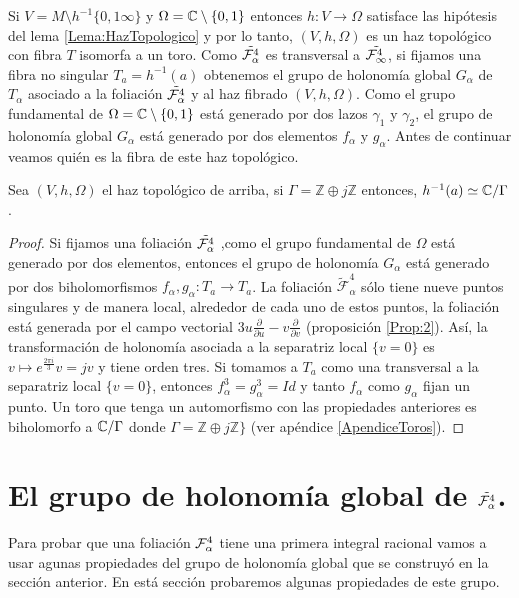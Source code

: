  Si $V=M\setminus h^{-1}\{0,1\infty\}$ y $\Omega=\mathbb{C}\setminus\{0,1\}$ entonces $h\colon V\rightarrow\Omega$ satisface las hipótesis del lema \ref{Lema:HazTopologico} y por lo tanto, $(V,h,\Omega)$ es un haz topológico con fibra $T$ isomorfa a un toro. Como $\tilde{\mathcal{F}_{\alpha}^{4}}$ es transversal a $\tilde{\mathcal{F}_{\infty}^{4}}$, si fijamos una fibra no singular $T_{a}=h^{-1}(a)$ obtenemos el grupo de holonomía global $G_{\alpha}$ de $T_{\alpha}$ asociado a la foliación $\tilde{\mathcal{F}_{\alpha}^{4}}$ y al haz fibrado $(V,h,\Omega)$. Como el grupo fundamental de $\Omega=\mathbb{C}\setminus\{0,1\}$ está generado por dos lazos $\gamma_{1}$ y $\gamma_{2}$, el grupo de holonomía global $G_{\alpha}$ está generado por dos elementos $f_{\alpha}$ y $g_{\alpha}$. Antes de continuar veamos quién es la fibra de este haz topológico.
\begin{Proposicion}
\label{Prop:FibraDelHaz}
Sea $(V,h,\Omega)$ el haz topológico de arriba, si $\Gamma=\mathbb{Z}\oplus j\mathbb{Z}$ entonces, $h^{-1}(a)\simeq\mathbb{C}/\Gamma$.
\end{Proposicion}
\begin{proof}
Si fijamos una foliación $\tilde{\mathcal{F}_{\alpha}^{4}}$ ,como el grupo fundamental de $\Omega$ está generado por dos elementos, entonces  el grupo de holonomía $G_{\alpha}$ está generado por dos biholomorfismos $f_{\alpha},g_{\alpha}\colon T_{a}\rightarrow T_{a}$. La foliación $\tilde{\mathcal{F}}_{\alpha}^{4}$ sólo tiene nueve puntos singulares y de manera local, alrededor de cada uno de estos puntos, la foliación está generada por el campo vectorial $3u\tfrac{\partial}{\partial u}-v\tfrac{\partial}{\partial v}$ (proposición \ref{Prop:2}). Así, la transformación de holonomía asociada a la separatriz local $\{v=0\}$ es $v\mapsto e^{\tfrac{2\pi i}{3}}v=jv$ y tiene orden tres. Si tomamos a $T_{a}$ como una transversal a la separatriz local $\{v=0\}$, entonces $f_{\alpha}^{3}=g_{\alpha}^{3}=Id$ y tanto $f_{\alpha}$ como $g_{\alpha}$ fijan un punto. Un toro que tenga un automorfismo con las propiedades anteriores es biholomorfo a $\mathbb{C}/\Gamma$ donde $\Gamma=\mathbb{Z}\oplus j\mathbb{Z} \}$ (ver apéndice \ref{ApendiceToros}).
\end{proof}

\section{El grupo de holonomía global de $\tilde{\mathcal{F}_{\alpha}^{4}}$.}

Para probar que una foliación $\mathcal{F}_{\alpha}^{4}$ tiene una primera integral racional vamos a usar agunas propiedades del grupo de holonomía global que se construyó en la sección anterior. En está sección probaremos algunas propiedades de este grupo. 

